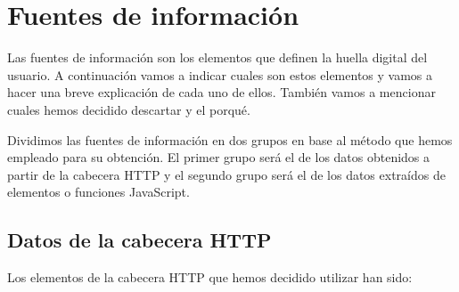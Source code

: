 \chapter{Fuentes de información}
\label{ch:fuentes_info}
Las fuentes de información son los elementos que definen la huella digital del usuario. A continuación vamos a indicar cuales son estos elementos y vamos a hacer una breve explicación de cada uno de ellos. También vamos a mencionar cuales hemos decidido descartar y el porqué.\par
Dividimos las fuentes de información en dos grupos en base al método que hemos empleado para su obtención. El primer grupo será el de los datos obtenidos a partir de la cabecera HTTP y el segundo grupo será el de los datos extraídos de elementos o funciones JavaScript.
\section{Datos de la cabecera HTTP}
\noindent Los elementos de la cabecera HTTP que hemos decidido utilizar han sido:
